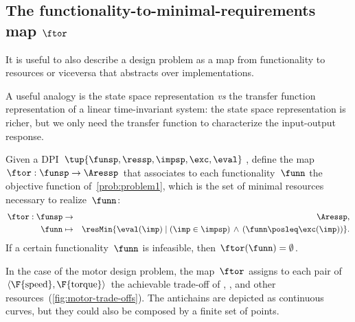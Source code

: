 

\subsection{The functionality-to-minimal-requirements map $\ftor$}

It is useful to also describe a design problem as a map from functionality
to  resources or viceversa that abstracts over implementations.

A useful analogy is the state space representation \emph{vs} the
transfer function representation of a linear time-invariant system:
the state space representation is richer, but we only need the transfer
function to characterize the input-output response.


\begin{definition}
\label{def:ftor}Given a DPI $\tup{ \funsp,\ressp,\impsp,\exc,\eval} $,
define the map~$\ftor:\funsp\rightarrow\Aressp$ that associates
to each functionality~$\funn$ the objective function of~\cref{prob:problem1},
which is the set of minimal resources necessary to realize~$\funn$:
\begin{eqnarray*}
\ftor:\funsp & \rightarrow & \Aressp,\\
\funn& \mapsto & \resMin\{\eval(\imp)\mid\left(\imp\in\impsp\right)\,\wedge\,\left(\funn\posleq\exc(\imp)\right)\}.
\end{eqnarray*}
If a certain functionality~$\funn$ is infeasible, then $\ftor(\funn)=\emptyset$.
\end{definition}



\begin{example}
In the case of the motor design problem, the map~$\ftor$ assigns
to each pair of $\left\langle \F{\text{speed}},\F{\text{torque}}\right\rangle $
the achievable trade-off of , , and other resources~(\cref{fig:motor-trade-offs}).
The antichains are depicted as continuous curves, but they could also
be composed by a finite set of points.

\end{example}

